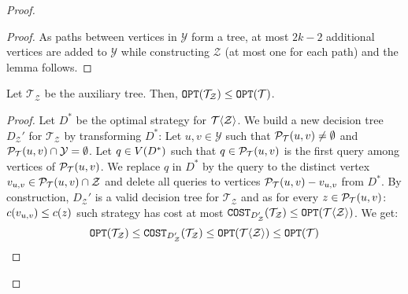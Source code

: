 \begin{theorem}
\begin{proof}
\begin{lemma}
\begin{proof}
        As paths between vertices in $\mathcal{Y}$ form a tree, at most $2k-2$ additional vertices are added to $\mathcal{Y}$ while constructing $\mathcal{Z}$ (at most one for each path) and the lemma follows.
    \end{proof}
\end{lemma}
\begin{lemma}\label{lemma:auxTreeCost}
    Let $\mathcal{T}_{\mathcal{Z}}$ be the auxiliary tree. Then, $\texttt{OPT}\mathopen{}\left( \mathcal{T}_{\mathcal{Z}} \right)\leq \texttt{OPT}\mathopen{}\left( \mathcal{T} \right)$.
    \begin{proof}
        Let $D^*$ be the optimal strategy for $\mathcal{T}\mathopen{}\langle \mathcal{Z} \rangle$. We build a new decision tree $D_{\mathcal{Z}}'$ for $\mathcal{T}_{\mathcal{Z}}$ by transforming $D^*$: Let $u,v\in \mathcal{Y}$ such that $\mathcal{P}_{\mathcal{T}}\mathopen{}\left( u, v \right)\neq\emptyset$ and $\mathcal{P}_{\mathcal{T}}\mathopen{}\left( u, v \right)\cap \mathcal{Y}=\emptyset$. Let $q\in V\mathopen{}\left( D^* \right)$ such that $q\in \mathcal{P}_{\mathcal{T}}\mathopen{}\left( u, v \right)$ is the first query among vertices of $\mathcal{P}_{\mathcal{T}}\mathopen{}\left( u, v \right)$. We replace $q$ in $D^*$ by the query to the distinct vertex $v_{u,v}\in \mathcal{P}_{\mathcal{T}}\mathopen{}\left( u, v \right)\cap \mathcal{Z}$ and delete all queries to vertices $\mathcal{P}_{\mathcal{T}}\mathopen{}\left( u, v \right)-v_{u,v}$ from $D^*$. By construction, $D_{\mathcal{Z}}'$ is a valid decision tree for $\mathcal{T}_{\mathcal{Z}}$ and as for every $z\in \mathcal{P}_{\mathcal{T}}\mathopen{}\left( u, v \right)$: $c\mathopen{}\left( v_{u,v} \right)\leq c\mathopen{}\left( z \right)$ such strategy has cost at most $\texttt{COST}_{D_{\mathcal{Z}}'}\mathopen{}\left( \mathcal{T}_{\mathcal{Z}} \right)\leq \texttt{OPT}\mathopen{}\left( \mathcal{T}\mathopen{}\langle \mathcal{Z} \rangle \right)$. We get:
        $$
        \texttt{OPT}\mathopen{}\left( \mathcal{T}_{\mathcal{Z}} \right)\leq \texttt{COST}_{D_{\mathcal{Z}}'}\mathopen{}\left( \mathcal{T}_{\mathcal{Z}} \right)\leq \texttt{OPT}\mathopen{}\left( \mathcal{T}\mathopen{}\langle \mathcal{Z} \rangle \right)\leq \texttt{OPT}\mathopen{}\left( \mathcal{T} \right)
        $$


\end{proof}
\end{lemma}
\end{proof}
\end{theorem}
